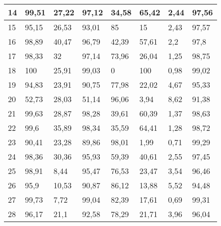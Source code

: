 \begin{longtable}[c]{|l|l|l|l|l|l|l|l|}
14              & 99,51        & 27,22        & 97,12       & 34,58         & 65,42         & 2,44          & 97,56         \\ \hline
15              & 95,15        & 26,53        & 93,01       & 85            & 15            & 2,43          & 97,57         \\ \hline
16              & 98,89        & 40,47        & 96,79       & 42,39         & 57,61         & 2,2           & 97,8          \\ \hline
17              & 98,33        & 32           & 97,14       & 73,96         & 26,04         & 1,25          & 98,75         \\ \hline
18              & 100          & 25,91        & 99,03       & 0             & 100           & 0,98          & 99,02         \\ \hline
19              & 94,83        & 23,91        & 90,75       & 77,98         & 22,02         & 4,67          & 95,33         \\ \hline
20              & 52,73        & 28,03        & 51,14       & 96,06         & 3,94          & 8,62          & 91,38         \\ \hline
21              & 99,63        & 28,87        & 98,28       & 39,61         & 60,39         & 1,37          & 98,63         \\ \hline
22              & 99,6         & 35,89        & 98,34       & 35,59         & 64,41         & 1,28          & 98,72         \\ \hline
23              & 90,41        & 23,28        & 89,86       & 98,01         & 1,99          & 0,71          & 99,29         \\ \hline
24              & 98,36        & 30,36        & 95,93       & 59,39         & 40,61         & 2,55          & 97,45         \\ \hline
25              & 98,91        & 8,44         & 95,47       & 76,53         & 23,47         & 3,54          & 96,46         \\ \hline
26              & 95,9         & 10,53        & 90,87       & 86,12         & 13,88         & 5,52          & 94,48         \\ \hline
27              & 99,73        & 7,72         & 99,04       & 82,39         & 17,61         & 0,69          & 99,31         \\ \hline
28              & 96,17        & 21,1         & 92,58       & 78,29         & 21,71         & 3,96          & 96,04         \\ \hline

\end{longtable}
